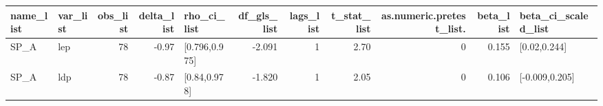 \begin{table}[ht]
\centering
\begin{tabular}{llrrlrrrrrl}
  \hline
name\_list & var\_list & obs\_list & delta\_list & rho\_ci\_list & df\_gls\_list & lags\_list & t\_stat\_list & as.numeric.pretest\_list. & beta\_list & beta\_ci\_scaled\_list \\ 
  \hline
SP\_A & lep & 78 & -0.97 & [0.796,0.975] & -2.091 & 1 & 2.70 & 0 & 0.155 & [0.02,0.244] \\ 
  SP\_A & ldp & 78 & -0.87 & [0.84,0.978] & -1.820 & 1 & 2.05 & 0 & 0.106 & [-0.009,0.205] \\ 
   \hline
\end{tabular}
\end{table}
